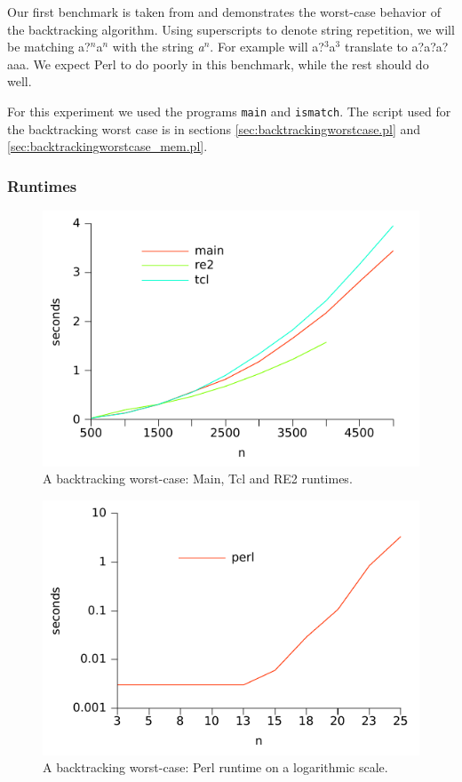 Our first benchmark is taken from \cite{RussCox} and demonstrates the
worst-case behavior of the backtracking algorithm. Using superscripts
to denote string repetition, we will be matching \textsf{a?$^n$a$^n$}
with the string \textsl{a$^n$}. For example will \textsf{a?$^3$a$^3$}
translate to \textsf{a?a?a?aaa}. We expect Perl to do poorly in this
benchmark, while the rest should do well.

For this experiment we used the programs \texttt{main} and
\texttt{ismatch}. The script used for the backtracking worst case is
in sections \vref{sec:backtrackingworstcase.pl} and
\vref{sec:backtrackingworstcase_mem.pl}.

\subsubsection*{Runtimes}

\begin{figure}
\centering
\includegraphics{benchmarks/backtrackingworstcase_maintclre2_normal.pdf}
\caption{A backtracking worst-case: Main, Tcl and RE2 runtimes.}
\label{fig:backtrackingworstcase_maintclre2_normal}
\end{figure}

\begin{figure}
\centering
\includegraphics{benchmarks/backtrackingworstcase_perl_log.pdf}
\caption{A backtracking worst-case: Perl runtime on a logarithmic scale.}
\label{fig:backtrackingworstcase_perl_log}
\end{figure}

